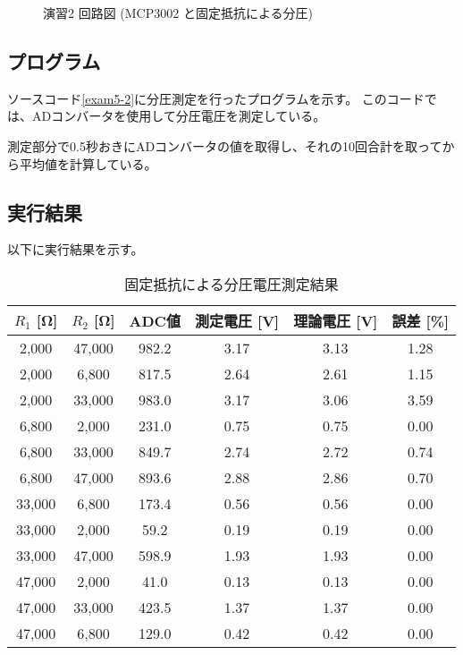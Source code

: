 \documentclass[a4paper,11pt,dvipdfmx]{jsarticle}
\begin{document}
\begin{figure}
\begin{tikzpicture}[scale=0.8, transform shape]
    \end{tikzpicture}
    \caption{演習2 回路図 (MCP3002 と固定抵抗による分圧)}
    \label{fig:exercise2_updated}
\end{figure}

\subsection{プログラム}
ソースコード\ref{exam5-2}に分圧測定を行ったプログラムを示す。
このコードでは、ADコンバータを使用して分圧電圧を測定している。

測定部分で0.5秒おきにADコンバータの値を取得し、それの10回合計を取ってから平均値を計算している。

\subsection{実行結果}
以下に実行結果を示す。
\begin{table}[htbp]
    \centering
    \caption{固定抵抗による分圧電圧測定結果}
    \begin{tabular}{|c|c|c|c|c|c|}
        \hline
        \textbf{$R_1$ [Ω]} & \textbf{$R_2$ [Ω]} & \textbf{ADC値} & \textbf{測定電圧 [V]} & \textbf{理論電圧 [V]} & \textbf{誤差 [\%]} \\
        \hline
        2,000 & 47,000 & 982.2 & 3.17 & 3.13 & 1.28 \\
        \hline
        2,000 & 6,800 & 817.5 & 2.64 & 2.61 & 1.15 \\
        \hline
        2,000 & 33,000 & 983.0 & 3.17 & 3.06 & 3.59 \\
        \hline
        6,800 & 2,000 & 231.0 & 0.75 & 0.75 & 0.00 \\
        \hline
        6,800 & 33,000 & 849.7 & 2.74 & 2.72 & 0.74 \\
        \hline
        6,800 & 47,000 & 893.6 & 2.88 & 2.86 & 0.70 \\
        \hline
        33,000 & 6,800 & 173.4 & 0.56 & 0.56 & 0.00 \\
        \hline
        33,000 & 2,000 & 59.2 & 0.19 & 0.19 & 0.00 \\
        \hline
        33,000 & 47,000 & 598.9 & 1.93 & 1.93 & 0.00 \\
        \hline
        47,000 & 2,000 & 41.0 & 0.13 & 0.13 & 0.00 \\
        \hline
        47,000 & 33,000 & 423.5 & 1.37 & 1.37 & 0.00 \\
        \hline
        47,000 & 6,800 & 129.0 & 0.42 & 0.42 & 0.00 \\
        \hline
    \end{tabular}
    \label{tab:voltage_divider_results}
\end{table}
\end{document}
